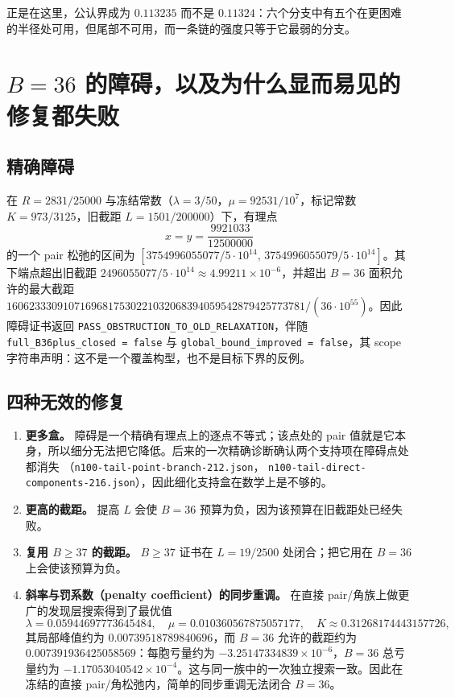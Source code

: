 正是在这里，公认界成为 $0.113235$ 而不是 $0.11324$：六个分支中有五个在更困难的半径处可用，但尾部不可用，而一条链的强度只等于它最弱的分支。

\section{$B=36$ 的障碍，以及为什么显而易见的修复都失败}

\subsection{精确障碍}

在 $R=2831/25000$ 与冻结常数（$\lambda=3/50$，$\mu=92531/10^{7}$，标记常数 $K=973/3125$，旧截距 $L=1501/200000$）下，有理点
\[
x=y=\frac{9921033}{12500000}
\]
的一个 pair 松弛的区间为
$[3754996055077/5\cdot10^{14},\,3754996055079/5\cdot10^{14}]$。其下端点超出旧截距 $2496055077/5\cdot10^{14}\approx4.99211\times10^{-6}$，并超出 $B=36$ 面积允许的最大截距
$16062333091071696817530221032068394059542879425773781/(36\cdot10^{55})$。因此障碍证书返回 \texttt{PASS\_\allowbreak{}OBSTRUCTION\_\allowbreak{}TO\_\allowbreak{}OLD\_\allowbreak{}RELAXATION}，伴随
\texttt{full\_\allowbreak{}B36plus\_\allowbreak{}closed = false} 与 \texttt{global\_\allowbreak{}bound\_\allowbreak{}improved = false}，其 scope 字符串声明：这不是一个覆盖构型，也不是目标下界的反例。

\subsection{四种无效的修复}

\begin{enumerate}[leftmargin=1.6em,itemsep=3pt]
\item \textbf{更多盒。} 障碍是一个精确有理点上的逐点不等式；该点处的 pair 值就是它本身，所以细分无法把它降低。后来的一次精确诊断确认两个支持项在障碍点处都消失
（\texttt{n100-\allowbreak{}tail-\allowbreak{}point-\allowbreak{}branch-\allowbreak{}212.json}，
\texttt{n100-\allowbreak{}tail-\allowbreak{}direct-\allowbreak{}components-\allowbreak{}216.json}），因此细化支持盒在数学上是不够的。
\item \textbf{更高的截距。} 提高 $L$ 会使 $B=36$ 预算为负，因为该预算在旧截距处已经失败。
\item \textbf{复用 $B\ge37$ 的截距。} $B\ge37$ 证书在 $L=19/2500$ 处闭合；把它用在 $B=36$ 上会使该预算为负。
\item \textbf{斜率与罚系数（penalty coefficient）的同步重调。} 在直接 pair/角族上做更广的发现层搜索得到了最优值
\[
\lambda=0.05944697773645484,\quad \mu=0.010360567875057177,\quad
K\approx0.31268174443157726,
\]
其局部峰值约为 $0.00739518789840696$，而 $B=36$ 允许的截距约为 $0.007391936425058569$：每胞亏量约为 $-3.25147334839\times10^{-6}$，$B=36$ 总亏量约为 $-1.17053040542\times10^{-4}$。这与同一族中的一次独立搜索一致。因此在冻结的直接 pair/角松弛内，简单的同步重调无法闭合 $B=36$。
\end{enumerate}

